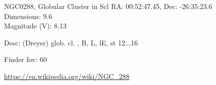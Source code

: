 \begin{block}{NGC0288, Globular Cluster in Scl}
    RA: 00:52:47.45, Dec: -26:35:23.6 \\ 
    Dimensions: 9.6 \\ 
    Magnitude (V): 8.13


    Desc: (Dreyer) glob. cl. , B, L, lE, st 12...16 

    Finder fov: 60 

    \url{https://en.wikipedia.org/wiki/NGC_288} 
\end{block}